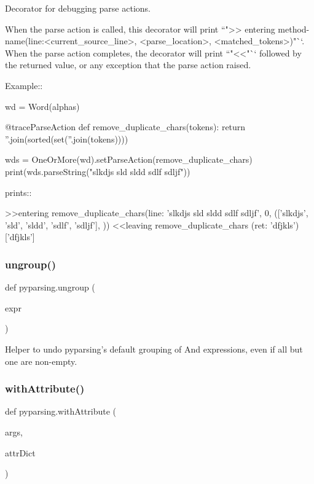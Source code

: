 \begin{DoxyVerb}Decorator for debugging parse actions.

When the parse action is called, this decorator will print
``">> entering method-name(line:<current_source_line>, <parse_location>, <matched_tokens>)"``.
When the parse action completes, the decorator will print
``"<<"`` followed by the returned value, or any exception that the parse action raised.

Example::

    wd = Word(alphas)

    @traceParseAction
    def remove_duplicate_chars(tokens):
        return ''.join(sorted(set(''.join(tokens))))

    wds = OneOrMore(wd).setParseAction(remove_duplicate_chars)
    print(wds.parseString("slkdjs sld sldd sdlf sdljf"))

prints::

    >>entering remove_duplicate_chars(line: 'slkdjs sld sldd sdlf sdljf', 0, (['slkdjs', 'sld', 'sldd', 'sdlf', 'sdljf'], {}))
    <<leaving remove_duplicate_chars (ret: 'dfjkls')
    ['dfjkls']
\end{DoxyVerb}
 \mbox{\label{namespacepyparsing_a88118fadaa81fc84f4c5a2c3a9ca4205}} 
\subsubsection{\texorpdfstring{ungroup()}{ungroup()}}
{\footnotesize\ttfamily def pyparsing.\+ungroup (\begin{DoxyParamCaption}\item[{}]{expr }\end{DoxyParamCaption})}

\begin{DoxyVerb}Helper to undo pyparsing's default grouping of And expressions,
even if all but one are non-empty.
\end{DoxyVerb}
 \mbox{\label{namespacepyparsing_ada8651dcae5c5d931d803b9e9a63e1e9}} 
\subsubsection{\texorpdfstring{with\+Attribute()}{withAttribute()}}
{\footnotesize\ttfamily def pyparsing.\+with\+Attribute (\begin{DoxyParamCaption}\item[{}]{args,  }\item[{}]{attr\+Dict }\end{DoxyParamCaption})}

